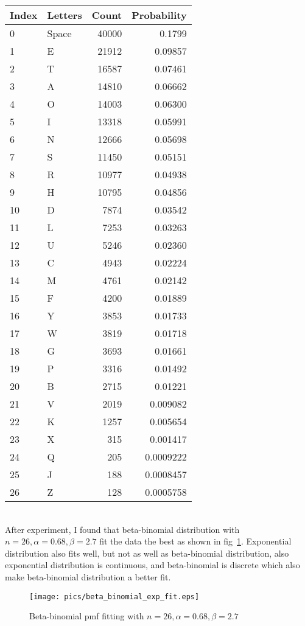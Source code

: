 \documentclass{assignment}
\begin{document}
\begin{enumerate}
\begin{enumerate}
    \begin{tabular}[h]{l|l|r|r}
      Index & Letters & Count & Probability\\
      \hline
      0     & Space   & 40000 & 0.1799\\
      1     & E       & 21912 & 0.09857\\
      2     & T       & 16587 & 0.07461\\
      3     & A       & 14810 & 0.06662\\
      4     & O       & 14003 & 0.06300\\
      5     & I       & 13318 & 0.05991\\
      6     & N       & 12666 & 0.05698\\
      7     & S       & 11450 & 0.05151\\
      8     & R       & 10977 & 0.04938\\
      9     & H       & 10795 & 0.04856\\
      10    & D       & 7874  & 0.03542\\
      11    & L       & 7253  & 0.03263\\
      12    & U       & 5246  & 0.02360\\
      13    & C       & 4943  & 0.02224\\
      14    & M       & 4761  & 0.02142\\
      15    & F       & 4200  & 0.01889\\
      16    & Y       & 3853  & 0.01733\\
      17    & W       & 3819  & 0.01718\\
      18    & G       & 3693  & 0.01661\\
      19    & P       & 3316  & 0.01492\\
      20    & B       & 2715  & 0.01221\\
      21    & V       & 2019  & 0.009082\\
      22    & K       & 1257  & 0.005654\\
      23    & X       & 315   & 0.001417\\
      24    & Q       & 205   & 0.0009222\\
      25    & J       & 188   & 0.0008457\\
      26    & Z       & 128   & 0.0005758
    \end{tabular} \\

    After experiment, I found that beta-binomial distribution with $n=26, \alpha=0.68, \beta=2.7$ fit the data the best
    as shown in fig~\ref{fig:beta-binomial-fit}. Exponential distribution also fits well, but not as well as
    beta-binomial distribution, also exponential distribution is continuous, and beta-binomial is discrete which also
    make beta-binomial distribution a better fit.
    \begin{figure}[!h]
      \centering
      \texttt{[image: pics/beta\_binomial\_exp\_fit.eps]}
      \caption{Beta-binomial pmf fitting with $n=26, \alpha=0.68, \beta=2.7$}
      \label{fig:beta-binomial-fit}
    \end{figure}


\end{enumerate}
\end{enumerate}
\end{document}
